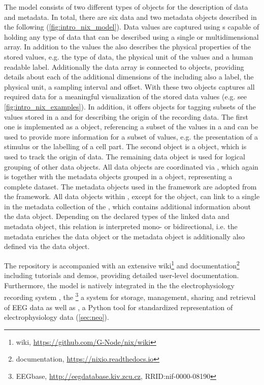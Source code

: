 The  model consists of two different types of objects for the description of data and metadata. In total, there are six data and two metadata objects  described in the following (\cref{fig:intro_nix_model}).
Data values are captured using s capable of holding any type of data that can be described using a single or multidimensional array. In addition to the values the  also describes the physical properties of the stored values, e.g. the type of data, the physical unit of the values and a human readable label. Additionally the data array is connected to  objects, providing details about each of the additional dimensions of the  including also a label, the physical unit, a sampling interval and offset. With these two objects  captures all required data for a meaningful visualization of the stored data values (e.g. see \cref{fig:intro_nix_examples}). In addition, it offers objects for tagging subsets of the values stored in a  and for describing the origin of the recording data. The first one is implemented as a  object, referencing a subset of the values in a  and can be used to provide more information for a subset of values, e.g. the presentation of a stimulus or the labelling of a cell part. The second object is a  object, which is used to track the origin of data. The remaining data object  is used for logical grouping of other  data objects. All data objects are coordinated via , which again is together with the metadata objects grouped in a   object, representing a complete dataset.
The metadata objects used in the  framework are adopted from the  framework. All data objects within , except for the  object, can link to a single  in the metadata collection of the  , which contains additional information about the data object. Depending on the declared types of the linked data and metadata object, this relation is interpreted mono- or bidirectional, i.e. the metadata  enriches the data object or the metadata object is additionally also defined via the data object.

The  repository is accompanied with an extensive wiki\footnote{ wiki, \url{https://github.com/G-Node/nix/wiki}} and documentation\footnote{ documentation, \url{https://nixio.readthedocs.io}} including tutorials and demos, providing detailed user-level documentation. Furthermore, the  model is natively integrated in the the electrophysiology recording system , the \footnote{EEGbase, \url{http://eegdatabase.kiv.zcu.cz}, RRID:nif-0000-08190} a system for storage, management, sharing and retrieval of EEG data as well as , a Python tool for standardized representation of electrophysiology data (\cref{sec:neo}).


